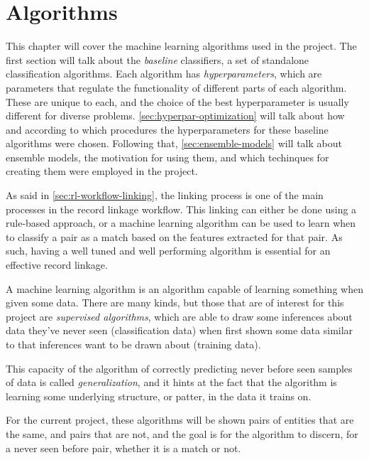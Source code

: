 \documentclass[epsfig,a4paper,11pt,titlepage,twoside,openany]{book}
\begin{document}
\chapter{Algorithms}
\label{chap:algorithms}


This chapter will cover the machine learning algorithms used in the project. The first section will talk about the \textit{baseline} classifiers, a set of standalone classification algorithms. Each algorithm has \textit{hyperparameters}, which are parameters that regulate the functionality of different parts of each algorithm. These are unique to each, and the choice of the best hyperparameter is usually different for diverse problems. \autoref{sec:hyperpar-optimization} will talk about how and according to which procedures the hyperparameters for these baseline algorithms were chosen. Following that, \autoref{sec:ensemble-models} will talk about ensemble models, the motivation for using them, and which techinques for creating them were employed in the project.

As said in \autoref{sec:rl-workflow-linking}, the linking process is one of the main processes in the record linkage workflow. This linking can either be done using a rule-based approach, or a machine learning algorithm can be used to learn when to classify a pair as a match based on the features extracted for that pair. As such, having a well tuned and well performing algorithm is essential for an effective record linkage.

A machine learning algorithm \cite{Russell:2009:AIM:1671238} is an algorithm capable of learning something when given some data. There are many kinds, but those that are of interest for this project are \textit{supervised algorithms}, which are able to draw some inferences about data they've never seen (classification data) when first shown some data similar to that inferences want to be drawn about (training data). 

This capacity of the algorithm of correctly predicting never before seen samples of data is called \textit{generalization}, and it hints at the fact that the algorithm is learning some underlying structure, or patter, in the data it trains on.

For the current project, these algorithms will be shown pairs of entities that are the same, and pairs that are not, and the goal is for the algorithm to discern, for a never seen before pair, whether it is a match or not.
\end{document}
